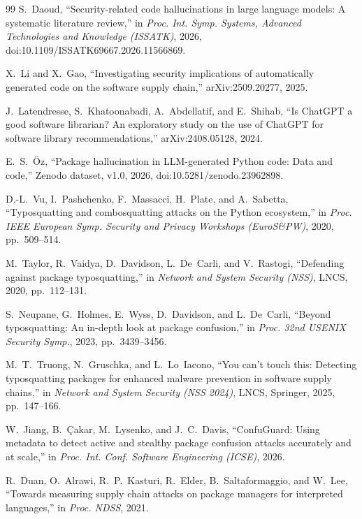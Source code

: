 \documentclass[conference]{IEEEtran}
\begin{document}
\begin{thebibliography}{99}
S.~Daoud, ``Security-related code hallucinations in large language models: A systematic literature review,'' in
\emph{Proc. Int. Symp. Systems, Advanced Technologies and Knowledge (ISSATK)}, 2026,
doi:10.1109/ISSATK69667.2026.11566869.

X.~Li and X.~Gao, ``Investigating security implications of automatically generated code on the software supply
chain,'' arXiv:2509.20277, 2025.

J.~Latendresse, S.~Khatoonabadi, A.~Abdellatif, and E.~Shihab, ``Is ChatGPT a good software librarian? An
exploratory study on the use of ChatGPT for software library recommendations,'' arXiv:2408.05128, 2024.

E.~S.~Öz, ``Package hallucination in LLM-generated Python code: Data and code,'' Zenodo dataset, v1.0, 2026,
doi:10.5281/zenodo.23962898.

D.-L.~Vu, I.~Pashchenko, F.~Massacci, H.~Plate, and A.~Sabetta,
``Typosquatting and combosquatting attacks on the Python ecosystem,''
in \emph{Proc. IEEE European Symp. Security and Privacy Workshops (EuroS\&PW)}, 2020, pp.~509--514.

M.~Taylor, R.~Vaidya, D.~Davidson, L.~De~Carli, and V.~Rastogi,
``Defending against package typosquatting,''
in \emph{Network and System Security (NSS)}, LNCS, 2020, pp.~112--131.

S.~Neupane, G.~Holmes, E.~Wyss, D.~Davidson, and L.~De~Carli,
``Beyond typosquatting: An in-depth look at package confusion,''
in \emph{Proc. 32nd USENIX Security Symp.}, 2023, pp.~3439--3456.

M.~T.~Truong, N.~Gruschka, and L.~Lo~Iacono,
``You can't touch this: Detecting typosquatting packages for enhanced malware prevention in software supply
chains,'' in \emph{Network and System Security (NSS 2024)}, LNCS, Springer, 2025, pp.~147--166.

W.~Jiang, B.~{\c{C}}akar, M.~Lysenko, and J.~C.~Davis,
``ConfuGuard: Using metadata to detect active and stealthy package confusion attacks accurately and at
scale,'' in \emph{Proc. Int. Conf. Software Engineering (ICSE)}, 2026.

R.~Duan, O.~Alrawi, R.~P.~Kasturi, R.~Elder, B.~Saltaformaggio, and W.~Lee,
``Towards measuring supply chain attacks on package managers for interpreted languages,''
in \emph{Proc. NDSS}, 2021.


\end{thebibliography}
\end{document}
